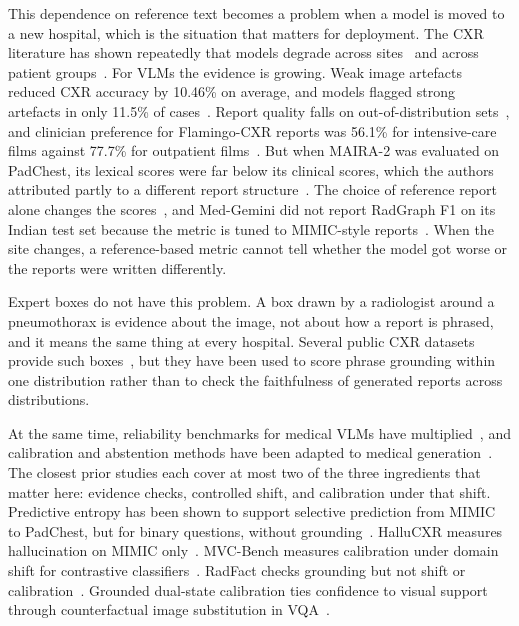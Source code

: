 \documentclass[pdflatex,sn-mathphys-num]{sn-jnl}
\theoremstyle{thmstyleone}
\begin{document}
This dependence on reference text becomes a problem when a model is moved to a new hospital, which is the situation that matters for deployment. The CXR literature has shown repeatedly that models degrade across sites~\cite{zech,degrave} and across patient groups~\cite{underdiag}. For VLMs the evidence is growing. Weak image artefacts reduced CXR accuracy by 10.46\% on average, and models flagged strong artefacts in only 11.5\% of cases~\cite{artefacts}. Report quality falls on out-of-distribution sets~\cite{hoppr,lrrg}, and clinician preference for Flamingo-CXR reports was 56.1\% for intensive-care films against 77.7\% for outpatient films~\cite{flamingocxr_nm}. But when MAIRA-2 was evaluated on PadChest, its lexical scores were far below its clinical scores, which the authors attributed partly to a different report structure~\cite{maira2}. The choice of reference report alone changes the scores~\cite{reportingpractice}, and Med-Gemini did not report RadGraph F1 on its Indian test set because the metric is tuned to MIMIC-style reports~\cite{medgemini}. When the site changes, a reference-based metric cannot tell whether the model got worse or the reports were written differently.

Expert boxes do not have this problem. A box drawn by a radiologist around a pneumothorax is evidence about the image, not about how a report is phrased, and it means the same thing at every hospital. Several public CXR datasets provide such boxes~\cite{chestxdet,nih14,vindr,padchestgr}, but they have been used to score phrase grounding within one distribution rather than to check the faithfulness of generated reports across distributions.

At the same time, reliability benchmarks for medical VLMs have multiplied~\cite{cares,probmed,medvh,medhallmark,medhallbench,medheval,surevqa,medqdeg,hallucxr,mvcbench,mccxr}, and calibration and abstention methods have been adapted to medical generation~\cite{semcons,conffact,confalign,score,adaptcal,conrep}. The closest prior studies each cover at most two of the three ingredients that matter here: evidence checks, controlled shift, and calibration under that shift. Predictive entropy has been shown to support selective prediction from MIMIC to PadChest, but for binary questions, without grounding~\cite{entropyshift}. HalluCXR measures hallucination on MIMIC only~\cite{hallucxr}. MVC-Bench measures calibration under domain shift for contrastive classifiers~\cite{mvcbench}. RadFact checks grounding but not shift or calibration~\cite{maira2}. Grounded dual-state calibration ties confidence to visual support through counterfactual image substitution in VQA~\cite{dualread}.
\end{document}

